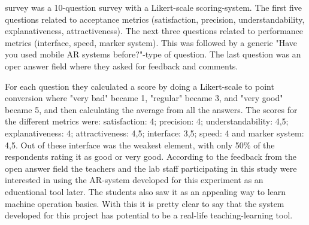 survey was a 10-question survey with a Likert-scale scoring-system. The first 
five questions related to acceptance metrics (satisfaction, precision, 
understandability, explanativeness, attractiveness). The next three questions 
related to performance metrics (interface, speed, marker system). This was 
followed by a generic "Have you used mobile AR systems before?"-type of 
question. The last question was an oper answer field where they asked for 
feedback and comments.\cite{reyesEtAl2016}\par
	For each question they calculated a score by doing a Likert-scale to 
point conversion where "very bad" became 1, "regular" became 3, and "very 
good" became 5, and then calculating the average from all the answers. The 
scores for the different metrics were: satisfaction: 4; precision: 4; 
understandability: 4,5; explanativeness: 4; attractiveness: 4,5; interface: 
3,5; speed: 4 and marker system: 4,5. Out of these interface was the weakest 
element, with only 50\% of the respondents rating it as good or very 
good.\cite{reyesEtAl2016} According to the feedback from the open answer 
field the teachers and the lab staff participating in this study were 
interested in using the AR-system developed for this experiment as an 
educational tool later. The students also saw it as an appealing way to learn 
machine operation basics.\cite{reyesEtAl2016} With this it is pretty clear to 
say that the system developed for this project has potential to be a 
real-life teaching-learning tool.
